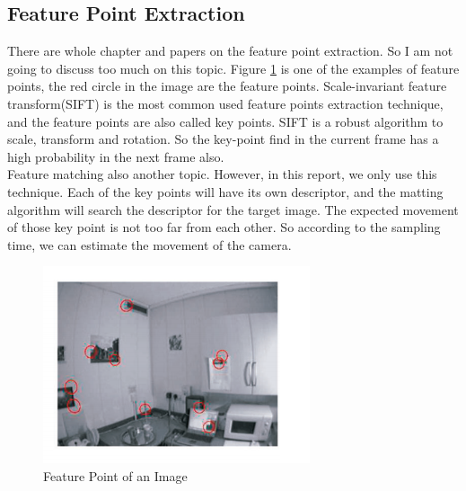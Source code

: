 \documentclass[10pt, conference, compsocconf]{IEEEtran}
\begin{document}
\subsection{Feature Point Extraction}
There are whole chapter and papers on the feature point extraction. So I am not going to discuss too much on this topic. Figure \ref{fig:featurePoint} is one of the examples of feature points, the red circle in the image are the feature points. Scale-invariant feature transform(SIFT) is the most common used feature points extraction technique, and the feature points are also called key points. SIFT is a robust algorithm to scale, transform and rotation. So the key-point find in the current frame has a high probability in the next frame also.\\
Feature matching also another topic. However, in this report, we only use this technique. Each of the key points will have its own descriptor, and the matting algorithm will search the descriptor for the target image. The expected movement of those key point is not too far from each other. So according to the sampling time, we can estimate the movement of the camera.
\begin{figure}[h]
	\centering
	\includegraphics[scale = 0.60]{image/featurePoint.png}
	\caption{Feature Point of an Image}
	\label{fig:featurePoint}
\end{figure}
\end{document}
